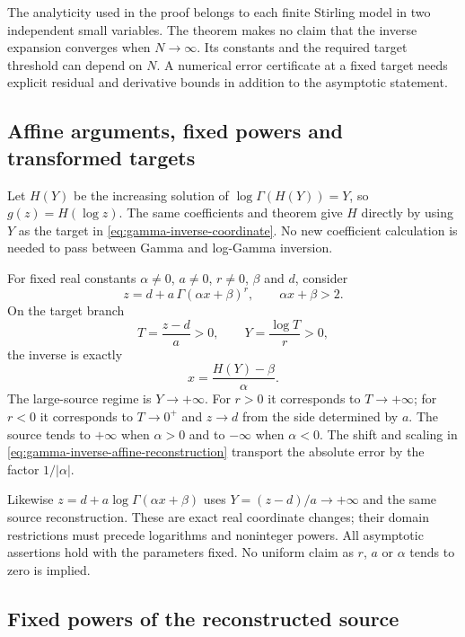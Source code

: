 The analyticity used in the proof belongs to each finite Stirling model
in two independent small variables. The theorem makes no claim that
the inverse expansion converges when $N\to\infty$. Its constants and
the required target threshold can depend on $N$. A numerical error
certificate at a fixed target needs explicit residual and derivative
bounds in addition to the asymptotic statement.

\subsection{Affine arguments, fixed powers and transformed targets}

Let $H(Y)$ be the increasing solution of $\log\Gamma(H(Y))=Y$,
so $g(z)=H(\log z)$. The same coefficients and theorem give $H$
directly by using $Y$ as the target in
\eqref{eq:gamma-inverse-coordinate}. No new coefficient calculation
is needed to pass between Gamma and log-Gamma inversion.

For fixed real constants $\alpha\ne0$, $a\ne0$, $r\ne0$, $\beta$
and $d$, consider
\begin{equation}
 z=d+a\,\Gamma(\alpha x+\beta)^r,
 \qquad \alpha x+\beta>2.
 \label{eq:gamma-inverse-affine-family}
\end{equation}
On the target branch
\[
 T=\frac{z-d}{a}>0,\qquad
 Y=\frac{\log T}{r}>0,
\]
the inverse is exactly
\begin{equation}
 x=\frac{H(Y)-\beta}{\alpha}.
 \label{eq:gamma-inverse-affine-reconstruction}
\end{equation}
The large-source regime is $Y\to+\infty$. For $r>0$ it corresponds
to $T\to+\infty$; for $r<0$ it corresponds to $T\to0^+$ and
$z\to d$ from the side determined by $a$. The source tends to
$+\infty$ when $\alpha>0$ and to $-\infty$ when $\alpha<0$.
The shift and scaling in \eqref{eq:gamma-inverse-affine-reconstruction}
transport the absolute error by the factor $1/|\alpha|$.

Likewise $z=d+a\log\Gamma(\alpha x+\beta)$ uses
$Y=(z-d)/a\to+\infty$ and the same source reconstruction.
These are exact real coordinate changes; their domain restrictions
must precede logarithms and noninteger powers. All asymptotic assertions
hold with the parameters fixed. No uniform claim as $r$, $a$ or
$\alpha$ tends to zero is implied.

\subsection{Fixed powers of the reconstructed source}

